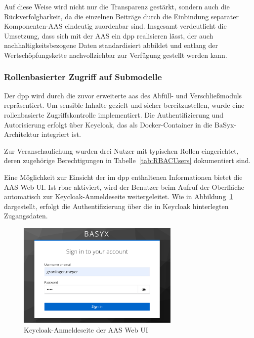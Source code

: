 Auf diese Weise wird nicht nur die Transparenz gestärkt, sondern auch die Rückverfolgbarkeit, da die einzelnen Beiträge durch die Einbindung separater Komponenten-AAS eindeutig zuordenbar sind. 
Insgesamt verdeutlicht die Umsetzung, dass sich mit der AAS ein \acs{dpp} realisieren lässt, der auch nachhaltigkeitsbezogene Daten standardisiert abbildet und entlang der Wertschöpfungskette nachvollziehbar zur Verfügung gestellt werden kann.

\newpage
\subsubsection{Rollenbasierter Zugriff auf Submodelle}
Der \acs{dpp} wird durch die zuvor erweiterte \acs{aas} des Abfüll- und Verschließmoduls repräsentiert. 
Um sensible Inhalte gezielt und sicher bereitzustellen, wurde eine rollenbasierte Zugriffskontrolle implementiert. 
Die Authentifizierung und Autorisierung erfolgt über Keycloak, das als Docker-Container in die BaSyx-Architektur integriert ist.

Zur Veranschaulichung wurden drei Nutzer mit typischen Rollen eingerichtet, deren zugehörige Berechtigungen in Tabelle~\ref{tab:RBACUsers} dokumentiert sind.


\vspace{-0.25em}   

\vspace{-0.25em}
Eine Möglichkeit zur Einsicht der im \acs{dpp} enthaltenen Informationen bietet die AAS Web UI.
Ist \acs{rbac} aktiviert, wird der Benutzer beim Aufruf der Oberfläche automatisch zur Keycloak-Anmeldeseite weitergeleitet.
Wie in Abbildung~\ref{fig:KeycloakAnmeldeSeite} dargestellt, erfolgt die Authentifizierung über die in Keycloak hinterlegten Zugangsdaten.

\vspace{0.4em}
\begin{figure}[htbp]
    \centering
        \includegraphics[width=0.7\textwidth]{Bilder/KeycloakAnmeldeSeite.png}
    \caption{Keycloak-Anmeldeseite der AAS Web UI}
    \label{fig:KeycloakAnmeldeSeite}
\end{figure}

